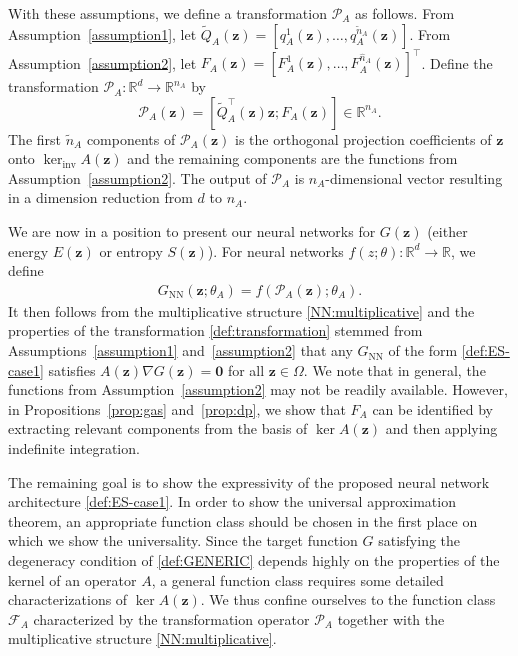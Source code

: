 \documentclass[openacc]{rsproca_new}%
\newcommand{\z}{\bm{z}}
\begin{document}
With these assumptions, we define a transformation $\mathcal{P}_A$ as follows.
From Assumption~\ref{assumption1},
let $\tilde{Q}_A(\z) = [q_A^1(\z),\dots,q_A^{\tilde{n}_A}(\z)]$.
From Assumption~\ref{assumption2},
let $F_A(\z) = [F^1_A(\z), \dots, F^{\hat{n}_A}_A(\z)]^\top$.
Define the transformation $\mathcal{P}_A:\mathbb{R}^d \to \mathbb{R}^{n_A}$ by
\begin{equation} \label{def:transformation}
    \mathcal{P}_{A}(\z) = [\tilde{Q}_A^\top(\z)\z; {F}_{A}(\z)] \in \mathbb{R}^{n_A}.
\end{equation}
The first $\tilde{n}_A$ components of $\mathcal{P}_A(\z)$
is the orthogonal projection coefficients of $\z$
onto $\ker_{\text{inv}}A(\z)$
and the remaining components are  
the functions from Assumption~\ref{assumption2}.
The output of $\mathcal{P}_A$
is $n_A$-dimensional vector resulting in 
a dimension reduction from $d$ to $n_A$.


We are now in a position to present our 
neural networks for $G(\z)$ (either energy $E(\z)$ or entropy $S(\z)$).
For neural networks
$f(z;\theta):\mathbb{R}^d \to \mathbb{R}$,
we define 
\begin{equation} \label{def:ES-case1}
    \begin{split}
        G_{\text{NN}}(\z;\theta_A) = f(\mathcal{P}_A(\z); \theta_A).
    \end{split}
\end{equation}
It then follows from 
the multiplicative structure \eqref{NN:multiplicative}
and the properties of the transformation \eqref{def:transformation} stemmed from 
Assumptions~\ref{assumption1} and~\ref{assumption2}
that 
any $G_{\text{NN}}$ of the form \eqref{def:ES-case1}
satisfies 
$A(\z)\nabla G(\z) = \bm{0}$ 
for all $\z \in \Omega$.
We note that in general, 
the functions from Assumption~\ref{assumption2}
may not be readily available.
However, in Propositions~\ref{prop:gas} and~\ref{prop:dp},
we show that $F_A$ can be identified by extracting relevant components from the basis of $\ker A(\z)$ and then applying indefinite integration.



The remaining goal is to show 
the expressivity of the proposed neural network architecture \eqref{def:ES-case1}.
In order to show the universal approximation theorem,
an appropriate function class should be chosen 
in the first place
on which we show the universality.
Since the target function $G$ satisfying the degeneracy condition of \eqref{def:GENERIC}
depends highly on the properties of the kernel of an operator $A$,
a general function class 
requires some detailed characterizations of $\ker A(\z)$.
We thus confine ourselves to 
the function class $\mathcal{F}_A$ 
characterized by the transformation operator $\mathcal{P}_A$
together with the multiplicative structure \eqref{NN:multiplicative}.
\end{document}
